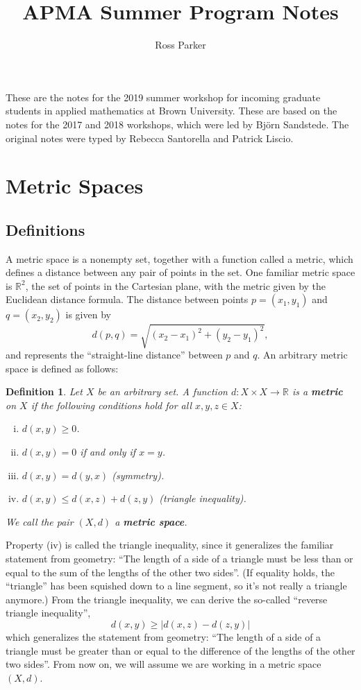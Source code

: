 \documentclass[12pt]{amsart}         %
\title{APMA Summer Program Notes}
\author{Ross Parker}
\newtheorem{definition}{Definition}[section]
\theoremstyle{remark}
\newcommand{\R}{\mathbb{R}}
\begin{document}
\maketitle

These are the notes for the 2019 summer workshop for incoming graduate students in applied mathematics at Brown University. These are based on the notes for the 2017 and 2018 workshops, which were led by Bj\"orn Sandstede. The original notes were typed by Rebecca Santorella and Patrick Liscio.

\tableofcontents

\section{Metric Spaces}\label{sec:metric_spaces}

\subsection{Definitions}

A metric space is a nonempty set, together with a function called a metric, which defines a distance between any pair of points in the set. One familiar metric space is $\R^2$, the set of points in the Cartesian plane, with the metric given by the Euclidean distance formula. The distance between points $p = (x_1, y_1)$ and $q = (x_2, y_2)$ is given by 
\[
d(p, q) = \sqrt{ (x_2 - x_1)^2 + (y_2 - y_1)^2 },
\]
and represents the ``straight-line distance'' between $p$ and $q$. An arbitrary metric space is defined as follows:

\begin{definition}
Let $X$ be an arbitrary set. A function $d : X \times X \rightarrow \mathbb{R}$ is a \textbf{metric} on $X$ if the following conditions hold for all $x, y, z \in X$:
\begin{enumerate}[(i)]
\item $d(x,y) \geq 0$.
\item $d(x,y) = 0$ if and only if $x = y$.
\item $d(x,y) = d(y,x)$ (symmetry).
\item $d(x,y) \leq d(x,z) + d(z,y)$ (triangle inequality).
\end{enumerate}
We call the pair $(X, d)$ a \textbf{metric space}.
\end{definition}

Property (iv) is called the triangle inequality, since it generalizes the familiar statement from geometry: ``The length of a side of a triangle must be less than or equal to the sum of the lengths of the other two sides''. (If equality holds, the ``triangle'' has been squished down to a line segment, so it's not really a triangle anymore.) From the triangle inequality, we can derive the so-called ``reverse triangle inequality'',
\[
d(x,y) \geq  |d(x,z) - d(z, y)|
\]
which generalizes the statement from geometry: ``The length of a side of a triangle must be greater than or equal to the difference of the lengths of the other two sides''. From now on, we will assume we are working in a metric space $(X, d)$.
\end{document}
